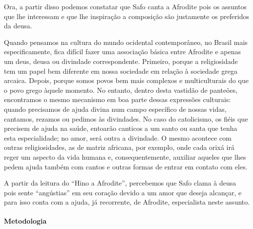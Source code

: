 \documentclass[12pt]{extarticle}
\begin{document}
Ora, a partir disso podemos constatar que Safo canta a Afrodite pois os assuntos
que lhe interessam e que lhe inspiração a composição são justamente os preferidos
da deusa. 

Quando pensamos na cultura do mundo ocidental contemporâneo, no Brasil mais
especificamente, fica difícil fazer uma associação básica entre Afrodite e apenas
um deus, deusa ou divindade correspondente. Primeiro, porque a religiosidade
tem um papel bem diferente em nossa sociedade em relação à sociedade grega
arcaica. Depois, porque somos povos bem mais complexos e multiculturais do que 
o povo grego àquele momento. No entanto, dentro desta vastidão de panteões,
encontramos o mesmo mecanismo em boa parte dessas expressões culturais: 
quando precisamos de ajuda divina num campo específico de nossas vidas, 
cantamos, rezamos ou pedimos às divindades. No caso do catolicismo, os fiéis
que precisem de ajuda na saúde, entoarão canticos a um santo ou santa que
tenha esta especialidade; no amor, será outra a divindade. O mesmo acontece
com outras religiosidades, as de matriz africana, por exemplo, onde cada
orixá irá reger um aspecto da vida humana e, consequentemente, auxiliar 
aqueles que lhes pedem ajuda também com cantos e outras formas de entrar
em contato com eles.

A partir da leitura do ``Hino a Afrodite'', percebemos que Safo clama
à deusa pois sente ``angústias'' em seu coração devido a um amor
que deseja alcançar, e para isso conta com a ajuda, já recorrente,
de Afrodite, especialista neste assunto. 


\paragraph{Metodologia}
\end{document}
